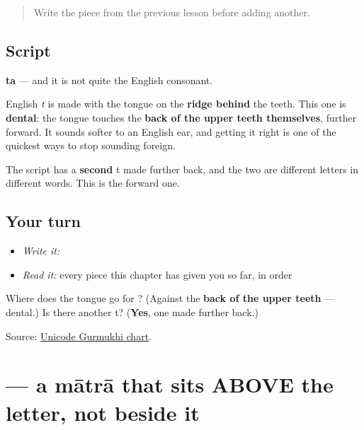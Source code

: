 \begin{quote}
Write the piece from the previous lesson before adding another.
\end{quote}

\subsection*{Script}

\begin{quote}
\end{quote}

\textbf{ta} — and it is not quite the English consonant.

English \emph{t} is made with the tongue on the \textbf{ridge behind} the teeth. This one is \textbf{dental}: the tongue touches the \textbf{back of the upper teeth themselves}, further forward. It sounds softer to an English ear, and getting it right is one of the quickest ways to stop sounding foreign.

The script has a \textbf{second} t made further back, and the two are different letters in different words. This is the forward one.

\subsection*{Your turn}
\begin{itemize}
\raggedright
  \item \emph{Write it:} 
  \item \emph{Read it:} every piece this chapter has given you so far, in order
\end{itemize}

\begin{tcolorbox}[breakable,colback=teal!4,colframe=teal!35!black,title={Before you move on}]
Where does the tongue go for \textbf{}? (Against the \textbf{back of the upper teeth} — dental.) Is there another t? (\textbf{Yes}, one made further back.)

Source: \href{https://www.unicode.org/charts/PDF/U0A00.pdf}{Unicode Gurmukhi chart}.
\end{tcolorbox}
\section[\texorpdfstring{\pa{ੇ} (-e)}{ੇ (-e)}]{ — a mātrā that sits ABOVE the letter, not beside it}

